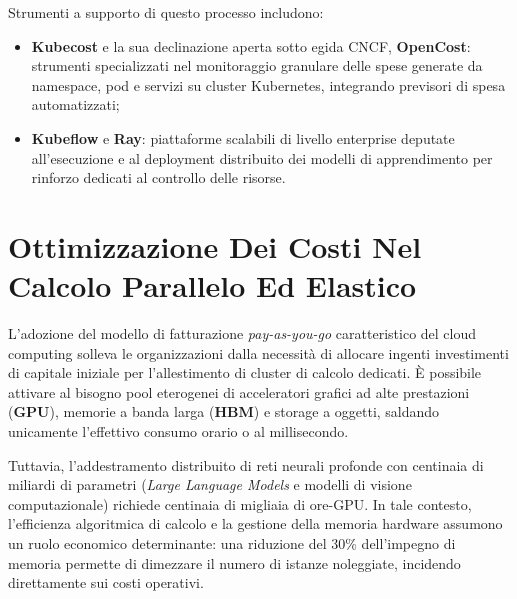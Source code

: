 \documentclass[11pt, a4paper]{article}
\begin{document}
Strumenti a supporto di questo processo includono:
\begin{itemize}
    \item \textbf{Kubecost} e la sua declinazione aperta sotto egida CNCF, \textbf{OpenCost}: strumenti specializzati nel monitoraggio granulare delle spese generate da namespace, pod e servizi su cluster Kubernetes, integrando previsori di spesa automatizzati;
    \item \textbf{Kubeflow} e \textbf{Ray}: piattaforme scalabili di livello enterprise deputate all'esecuzione e al deployment distribuito dei modelli di apprendimento per rinforzo dedicati al controllo delle risorse.
\end{itemize}

\newpage


\section{Ottimizzazione Dei Costi Nel Calcolo Parallelo Ed Elastico}

L'adozione del modello di fatturazione \emph{pay-as-you-go} caratteristico del cloud computing solleva le organizzazioni dalla necessità di allocare ingenti investimenti di capitale iniziale per l'allestimento di cluster di calcolo dedicati. È possibile attivare al bisogno pool eterogenei di acceleratori grafici ad alte prestazioni (\textbf{GPU}), memorie a banda larga (\textbf{HBM}) e storage a oggetti, saldando unicamente l'effettivo consumo orario o al millisecondo.


Tuttavia, l'addestramento distribuito di reti neurali profonde con centinaia di miliardi di parametri (\emph{Large Language Models} e modelli di visione computazionale) richiede centinaia di migliaia di ore-GPU. In tale contesto, l'efficienza algoritmica di calcolo e la gestione della memoria hardware assumono un ruolo economico determinante: una riduzione del 30\% dell'impegno di memoria permette di dimezzare il numero di istanze noleggiate, incidendo direttamente sui costi operativi.
\end{document}
